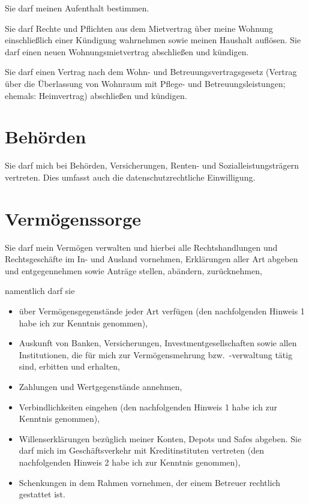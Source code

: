 \documentclass[pdftex,12pt,a4paper]{article}
\begin{document}
Sie darf meinen Aufenthalt bestimmen. 

Sie darf Rechte und Pflichten aus dem Mietvertrag über meine Wohnung
einschließlich
einer Kündigung wahrnehmen sowie meinen Haushalt auflösen. 
Sie darf einen neuen Wohnungsmietvertrag abschließen und kündigen.

 
 
Sie darf einen Vertrag nach dem Wohn- und Betreuungsvertragsgesetz
(Vertrag über die Überlassung von Wohnraum mit Pflege- und Betreuungsleistungen; ehemals: Heimvertrag) abschließen und kündigen. 


\section{Behörden}

Sie darf mich bei Behörden, Versicherungen, Renten- und Sozialleistungsträgern vertreten. Dies umfasst auch die 
datenschutzrechtliche Einwilligung.

 

\section{Vermögenssorge}

Sie darf mein Vermögen verwalten und hierbei alle Rechtshandlungen und
Rechtsgeschäfte im In- und Ausland vornehmen, Erklärungen aller Art abgeben
und entgegennehmen sowie Anträge stellen, abändern, zurücknehmen, 

namentlich darf sie

\begin{itemize}

\item über Vermögensgegenstände jeder Art verfügen (den nachfolgenden
 Hinweis 1 habe ich zur Kenntnis genommen),
 
 \item Auskunft von Banken, Versicherungen, Investmentgesellschaften
 sowie allen Institutionen, die für mich zur Vermögensmehrung 
 bzw.\ -verwaltung tätig sind, erbitten und erhalten,

\item Zahlungen und Wertgegenstände annehmen,

\item Verbindlichkeiten eingehen (den nachfolgenden
 Hinweis 1 habe ich zur Kenntnis genommen),

\item Willenserklärungen bezüglich meiner Konten, Depots und Safes abgeben. Sie darf
mich im Geschäftsverkehr mit Kreditinstituten vertreten (den nachfolgenden
 Hinweis 2 habe ich zur Kenntnis genommen),

\item Schenkungen in dem Rahmen vornehmen, der einem Betreuer rechtlich gestattet ist. 

\end{itemize}
\end{document}
